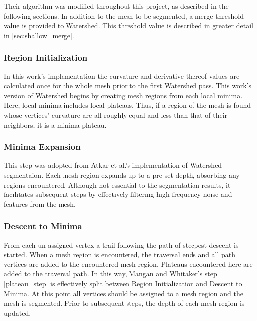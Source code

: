 Their algorithm was modified throughout this project, as described in the following sections.
In addition to the mesh to be segmented, a merge threshold value is provided to Watershed.
This threshold value is described in greater detail in \ref{sec:shallow_merge}.

\subsubsection{Region Initialization}\label{sec:ws_reg_init}
In this work's implementation the curvature and derivative thereof values are calculated once for the whole mesh prior to the first Watershed pass.
This work's version of Watershed begins by creating mesh regions from each local minima.
Here, local minima includes local plateaus.
Thus, if a region of the mesh is found whose vertices' curvature are all roughly equal and less than that of their neighbors, it is a minima plateau.

\subsubsection{Minima Expansion}
This step was adopted from Atkar et al.'s implementation of Watershed segmentaion\cite{HierSurfSeg_for_autobody_painting}.
Each mesh region expands up to a pre-set depth, absorbing any regions encountered.
Although not essential to the segmentation results, it facilitates subsequent steps by effectively filtering high frequency noise and features from the mesh.

\subsubsection{Descent to Minima}
From each un-assigned vertex a trail following the path of steepest descent is started.
When a mesh region is encountered, the traversal ends and all path vertices are added to the encountered mesh region.
Plateaus encountered here are added to the traversal path.
In this way, Mangan and Whitaker's step \ref{plateau_step} is effectively split between Region Initialization and Descent to Minima.
At this point all vertices should be assigned to a mesh region and the mesh is segmented.
Prior to subsequent steps, the depth of each mesh region is updated.

